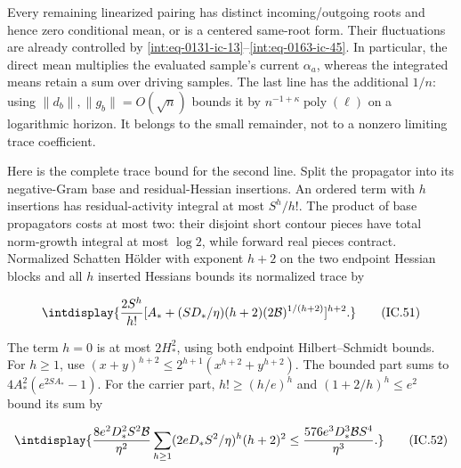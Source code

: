 
Every remaining linearized pairing has distinct incoming/outgoing roots and hence zero conditional mean, or is a centered same-root form. Their fluctuations are already controlled by \eqref{int:eq-0131-ic-13}--\allowbreak \eqref{int:eq-0163-ic-45}. In particular, the direct mean multiplies the evaluated sample's current \(\alpha_a\), whereas the integrated means retain a sum over driving samples. The last line has the additional \(1/n\): using \(\|d_b\|,\allowbreak \|g_b\|=O(\sqrt n)\) bounds it by \(n^{-1+\kappa}\operatorname{poly}(\ell)\) on a logarithmic horizon. It belongs to the small remainder, not to a nonzero limiting trace coefficient.



Here is the complete trace bound for the second line. Split the propagator into its negative-Gram base and residual-Hessian insertions. An ordered term with \(h\) insertions has residual-activity integral at most \(S^h/h!\). The product of base propagators costs at most two: their disjoint short contour pieces have total norm-growth integral at most \(\log2\), while forward real pieces contract. Normalized Schatten Hölder with exponent \(h+2\) on the two endpoint Hessian blocks and all \(h\) inserted Hessians bounds its normalized trace by


\begingroup\renewcommand{\theHequation}{intdisplay.355}
\begin{equation}
\intdisplay{
\frac{2S^h}{h!}
 [A_*+(SD_*/\eta)(h+2)(2\mathcal B)^{1/(h+2)}]^{h+2}.
}
\tag{IC.51}
\label{int:eq-0169-ic-51}
\end{equation}
\endgroup


The term \(h=0\) is at most \(2H_*^2\), using both endpoint Hilbert--Schmidt bounds. For \(h\ge1\), use \((x+y)^{h+2}\le2^{h+1}(x^{h+2}+y^{h+2})\). The bounded part sums to \(4A_*^2(e^{2SA_*}-1)\). For the carrier part, \(h!\ge(h/e)^h\) and \((1+2/h)^h\le e^2\) bound its sum by


\begingroup\renewcommand{\theHequation}{intdisplay.356}
\begin{equation}
\intdisplay{
\frac{8e^2D_*^2S^2\mathcal B}{\eta^2}
 \sum_{h\ge1}(2eD_*S^2/\eta)^h(h+2)^2
 \le\frac{576e^3D_*^3\mathcal B S^4}{\eta^3}.
}
\tag{IC.52}
\label{int:eq-0170-ic-52}
\end{equation}
\endgroup

